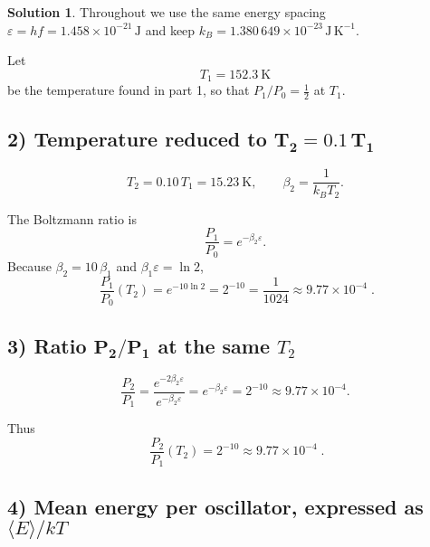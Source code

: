 \documentclass[12pt]{article}
\theoremstyle{definition} %
\newtheorem{solution}{Solution}
\theoremstyle{plain} %
\begin{document}
    \begin{solution}
      Throughout we use the same energy spacing 
      \(\varepsilon = h f = 1.458\times10^{-21}\,\mathrm{J}\) and keep
      \(\displaystyle k_B = 1.380\,649\times10^{-23}\,\mathrm{J\,K^{-1}}\).
      
      Let 
      \[
      T_1 = 152.3\ \mathrm{K}
      \]
      be the temperature found in part 1, so that  
      \(P_1/P_0 = \tfrac12\) at \(T_1\).
      
      \vspace{0.5em}
      \subsection*{2)  Temperature reduced to \(\boldsymbol{T_2 = 0.1\,T_1}\)}
      
      \[
      T_2 = 0.10\,T_1 = 15.23\ \mathrm{K}, 
      \qquad
      \beta_2 = \frac1{k_B T_2}.
      \]
      
      The Boltzmann ratio is 
      \[
      \frac{P_1}{P_0} = e^{-\beta_2\varepsilon}.
      \]
      Because \(\beta_2 = 10\,\beta_1\) and \(\beta_1\varepsilon=\ln 2\),
      \[
      \boxed{\;
      \frac{P_1}{P_0}(T_2)
            = e^{-10\ln 2}
            = 2^{-10}
            = \frac1{1024}
            \approx 9.77\times10^{-4}
      \;} .
      \]
      
      \vspace{0.5em}
      \subsection*{3)  Ratio \(\boldsymbol{P_2/P_1}\) at the same \(T_2\)}
      
      \[
      \frac{P_2}{P_1}
        = \frac{e^{-2\beta_2\varepsilon}}{e^{-\beta_2\varepsilon}}
        = e^{-\beta_2\varepsilon}
        = 2^{-10}
        \approx 9.77\times10^{-4}.
      \]
      
      Thus
      \[
      \boxed{\;
      \frac{P_2}{P_1}(T_2) = 2^{-10} \approx 9.77\times10^{-4}
      \;} .
      \]
      
      \vspace{0.5em}
      \subsection*{4)  Mean energy per oscillator, expressed as \(\langle E\rangle /kT\)}
      

\end{solution}
\end{document}
